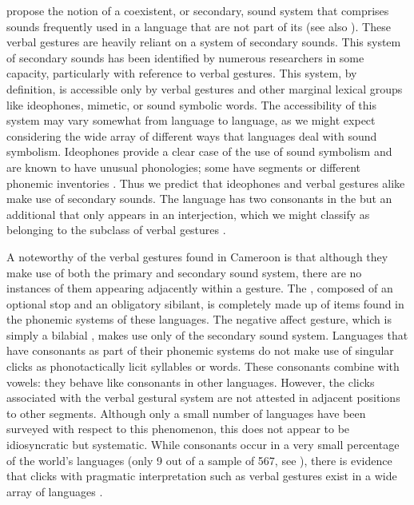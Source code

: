\documentclass[output=paper,newtxmath,modfonts,nonflat,hidelinks]{langsci/langscibook}
\begin{document}
\citet{friespike} propose the notion of a coexistent, or secondary, sound system that comprises sounds frequently used in a language that are not part of its  (see also \citealt{harris1951}). These verbal gestures are heavily reliant on a system of secondary sounds. This system of secondary sounds has been identified by numerous researchers in some capacity, particularly with reference to verbal gestures. This system, by definition, is accessible only by verbal gestures and other marginal lexical groups like ideophones, mimetic, or sound symbolic words. The accessibility of this system may vary somewhat from language to language, as we might expect considering the wide array of different ways that languages deal with sound symbolism. Ideophones provide a clear case of the use of sound symbolism and are known to have unusual phonologies; some have segments or different phonemic inventories \citep[181-185]{childs1994}.  Thus we predict that ideophones and verbal gestures alike make use of secondary sounds. The  language  has two  consonants in the  but an additional  that only appears in an interjection, which we might classify as belonging to the subclass of verbal gestures \citep[130]{BostoenSands2012}.

A noteworthy  of the verbal gestures found in Cameroon is that although they make use of both the primary and secondary sound system, there are no instances of them appearing adjacently within a gesture. The , composed of an optional stop and an obligatory sibilant, is completely made up of items found in the phonemic systems of these languages. The negative affect gesture, which is simply a bilabial , makes use only of the secondary sound system. Languages that have  consonants as part of their phonemic systems do not make use of singular clicks as phonotactically licit syllables or words. These consonants combine with vowels: they behave like consonants in other languages. However, the clicks associated with the verbal gestural system are not attested in adjacent positions to other segments. Although only a small number of languages have been surveyed with respect to this phenomenon, this does not appear to be idiosyncratic but systematic. While  consonants occur in a very small percentage of the world's languages (only 9 out of a sample of 567, see \citealt{wals-19}), there is evidence that clicks with pragmatic interpretation such as verbal gestures exist in a wide array of languages \citep{wals-142}. %
\end{document}
